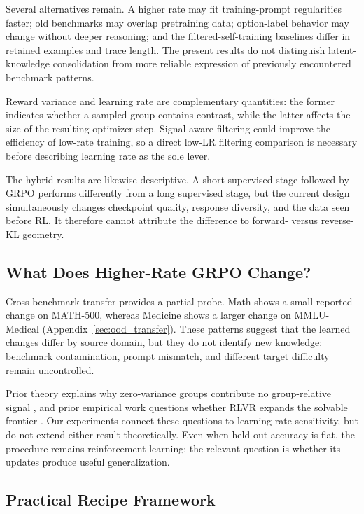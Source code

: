 \documentclass[11pt]{article}
\begin{document}
Several alternatives remain. A higher rate may fit training-prompt regularities faster; old benchmarks may overlap pretraining data; option-label behavior may change without deeper reasoning; and the filtered-self-training baselines differ in retained examples and trace length. The present results do not distinguish latent-knowledge consolidation from more reliable expression of previously encountered benchmark patterns.

Reward variance and learning rate are complementary quantities: the former indicates whether a sampled group contains contrast, while the latter affects the size of the resulting optimizer step. Signal-aware filtering could improve the efficiency of low-rate training, so a direct low-LR filtering comparison is necessary before describing learning rate as the sole lever.

The hybrid results are likewise descriptive. A short supervised stage followed by GRPO performs differently from a long supervised stage, but the current design simultaneously changes checkpoint quality, response diversity, and the data seen before RL. It therefore cannot attribute the difference to forward- versus reverse-KL geometry.

\subsection{What Does Higher-Rate GRPO Change?}

Cross-benchmark transfer provides a partial probe. Math shows a small reported change on MATH-500, whereas Medicine shows a larger change on MMLU-Medical (Appendix~\ref{sec:ood_transfer}). These patterns suggest that the learned changes differ by source domain, but they do not identify new knowledge: benchmark contamination, prompt mismatch, and different target difficulty remain uncontrolled.

Prior theory explains why zero-variance groups contribute no group-relative signal \citep{bae2025difficulty}, and prior empirical work questions whether RLVR expands the solvable frontier \citep{yue2025doesrl}. Our experiments connect these questions to learning-rate sensitivity, but do not extend either result theoretically. Even when held-out accuracy is flat, the procedure remains reinforcement learning; the relevant question is whether its updates produce useful generalization.

\subsection{Practical Recipe Framework}
\end{document}
